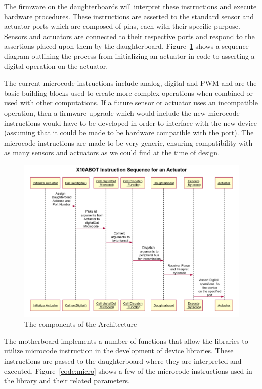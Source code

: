 	The firmware on the daughterboards will interpret these instructions and execute hardware procedures. These instructions are asserted to the standard sensor and actuator ports which are composed of pins, each with their specific purpose. Sensors and actuators are connected to their respective ports and respond to the assertions placed upon them by the daughterboard. Figure~\ref{fig:sequence} shows a sequence diagram outlining the process from initializing an actuator in code to asserting a digital operation on the actuator.
	
 The current microcode instructions include analog, digital and PWM and are the basic building blocks used to create more complex operations when combined or used with other computations. If a future sensor or actuator uses an incompatible operation, then a firmware upgrade which would include the new microcode instructions would have to be developed in order to interface with the new device (assuming that it could be made to be hardware compatible with the port). The microcode instructions are made to be very generic, ensuring compatibility with as many sensors and actuators as we could find at the time of design.


    \begin{figure}[H]
  \begin{center}
    \includegraphics[width=1.0\columnwidth]{Figures/sequence.pdf}
    \caption{The components of the \xten Architecture}
    \label{fig:sequence}
  \end{center}
\end{figure}


	The motherboard implements a number of functions that allow the libraries to utilize microcode instruction in the development of device libraries. These instructions are passed to the daughterboard where they are interpreted and executed. Figure~\ref{code:micro} shows a few of the microcode instructions used in the \xten library and their related parameters.
	
